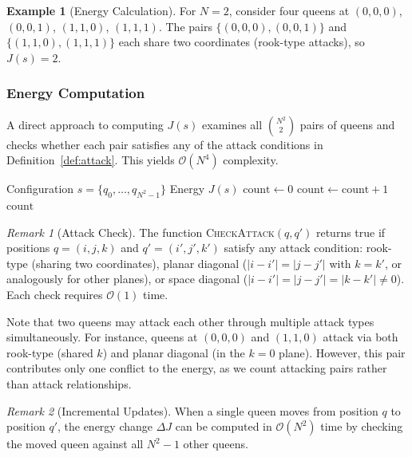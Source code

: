 \documentclass[10pt,twocolumn,a4paper]{article}
\newcommand{\bigO}{\mathcal{O}}
\theoremstyle{definition}
\newtheorem{example}{Example}[section]
\theoremstyle{remark}
\newtheorem{remark}{Remark}[section]
\begin{document}
\begin{example}[Energy Calculation]
For $N=2$, consider four queens at $(0,0,0)$, $(0,0,1)$, $(1,1,0)$, $(1,1,1)$. The pairs $\{(0,0,0),(0,0,1)\}$ and $\{(1,1,0),(1,1,1)\}$ each share two coordinates (rook-type attacks), so $J(s)=2$.
\end{example}

\subsubsection{Energy Computation}
A direct approach to computing $J(s)$ examines all $\binom{N^2}{2}$ pairs of queens and checks whether each pair satisfies any of the attack conditions in Definition~\ref{def:attack}. This yields $\bigO(N^4)$ complexity.

\begin{algorithm}[H]
\caption{Direct Energy Computation}
\begin{algorithmic}[1]
\Require Configuration $s=\{q_0,\ldots,q_{N^2-1}\}$
\Ensure Energy $J(s)$
\State $\mathrm{count}\gets0$
\State $\mathrm{count}\gets\mathrm{count}+1$
\EndIf
\EndFor
\EndFor
\State \Return $\mathrm{count}$
\end{algorithmic}
\end{algorithm}

\begin{remark}[Attack Check]
The function \textsc{CheckAttack}$(q,q')$ returns true if positions $q=(i,j,k)$ and $q'=(i',j',k')$ satisfy any attack condition: rook-type (sharing two coordinates), planar diagonal ($|i-i'|=|j-j'|$ with $k=k'$, or analogously for other planes), or space diagonal ($|i-i'|=|j-j'|=|k-k'|\ne0$). Each check requires $\bigO(1)$ time.
\end{remark}

Note that two queens may attack each other through multiple attack types simultaneously. For instance, queens at $(0,0,0)$ and $(1,1,0)$ attack via both rook-type (shared $k$) and planar diagonal (in the $k=0$ plane). However, this pair contributes only one conflict to the energy, as we count attacking pairs rather than attack relationships.

\begin{remark}[Incremental Updates]
When a single queen moves from position $q$ to position $q'$, the energy change $\Delta J$ can be computed in $\bigO(N^2)$ time by checking the moved queen against all $N^2-1$ other queens.
\end{remark}
\end{document}
